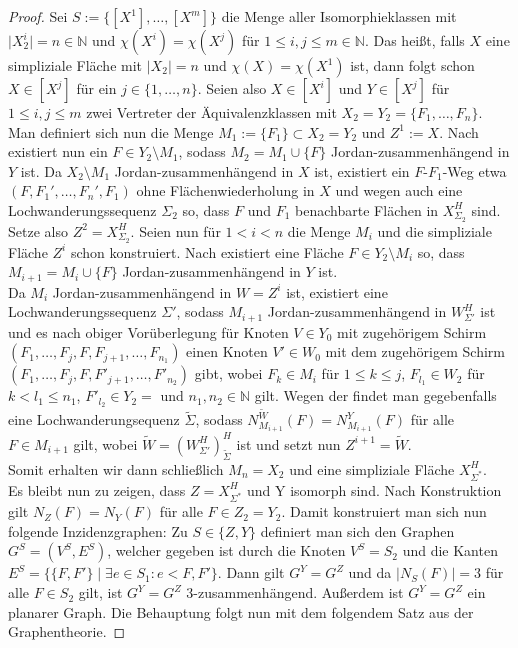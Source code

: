 \documentclass[12pt,titlepage,twoside,cleardoublepage]{article}
\theoremstyle{nummermitklammern}
\numberwithin{equation}{section}
\begin{document}
\begin{proof}
Sei $S:=\{[X^1],\ldots,[X^m]\}$ die Menge aller Isomorphieklassen mit $\vert X^i_2 \vert =n \in \mathbb{N}$ und $\chi(X^i)=\chi(X^j)$ für 
$1 \leq i,j \leq m \in \mathbb{N}$. Das heißt, falls $X$ eine simpliziale Fläche mit $\vert X_2 \vert = n$ und $\chi(X)=\chi(X^1)$ ist, dann folgt schon $X \in [X^j]$ für ein $j \in \{1,\ldots,n\}$. Seien also $X \in [X^i]$ und $Y \in [X^j]$ für $1 \leq i,j \leq m$ zwei Vertreter der Äquivalenzklassen mit $X_2=Y_2=\{F_1,\ldots,F_n\}$.
 Man definiert sich nun die Menge $M_1:=\{F_1\} \subset X_2=Y_2$ und $Z^1:=X$. Nach  existiert nun ein $F \in Y_2\setminus M_1$, sodass $M_2=M_1 \cup \{F\}$ Jordan-zusammenhängend in $Y$ ist. Da $X_2 \setminus M_1$ Jordan-zusammenhängend in $X$ ist, existiert ein $F$-$F_1$-Weg etwa $(F,F_1',\ldots,F_n',F_1)$ ohne Flächenwiederholung in $X$ und wegen  auch eine Lochwanderungssequenz $\Sigma_2$ so, dass $F$ und $F_1$ benachbarte Flächen in $X^H_{\Sigma_2} $ sind. Setze also $Z^2=X^H_{\Sigma_2}$. Seien nun für $1 < i < n$ die Menge $M_i$ und die simpliziale Fläche $Z^i$ schon konstruiert. Nach   existiert eine Fläche $F \in Y_2 \setminus M_i$ so, dass $M_{i+1}=M_i \cup \{F\}$ Jordan-zusammenhängend in $Y$ ist. \\
  Da $M_i$ Jordan-zusammenhängend in $W={Z^i}$ ist, existiert eine Lochwanderungssequenz $\Sigma'$, sodass $M_{i+1}$ Jordan-zusammenhängend in $W^H_{\Sigma'}$ ist und es nach obiger Vorüberlegung für Knoten $V\in Y_0$ mit zugehörigem Schirm \\$(F_1,\ldots,F_j,F,F_{j+1},\ldots,F_{n_1})$ einen Knoten $V'\in W_0$ mit dem zugehörigem Schirm $(F_1,\ldots,F_j,F,F'_{j+1},\ldots,F'_{n_2})$ gibt, wobei $F_k \in M_i$ für $1\leq k\leq j$, $F_{l_1}\in W_2$ für $k< l_1 \leq n_1$, $F'_{l_2}\in Y_2=$ und $n_1,n_2 \in \mathbb{N}$ gilt. Wegen der  findet man gegebenfalls eine Lochwanderungsequenz $\tilde{\Sigma}$, sodass $N_{M_{i+1}}^{\tilde{W}}(F)=N_{M_{i+1}}^Y(F)$ für alle $F \in M_{i+1}$ gilt, wobei $\tilde{W}={(W_{\Sigma'}^H)}^H_{\tilde{\Sigma}}$ ist  und setzt nun $Z^{i+1}=\tilde{W}$.\\
Somit erhalten wir dann schließlich $M_n=X_2$ und eine simpliziale Fläche $X^H_{\Sigma^*}$.\\ Es bleibt nun zu zeigen, dass $Z=X^H_{\Sigma^*}$ und Y isomorph sind. Nach Konstruktion gilt $N_Z(F)=N_Y(F)$ für alle $F\in Z_2=Y_2$. Damit konstruiert man sich nun folgende Inzidenzgraphen: 
Zu $S\in \{Z,Y\}$ definiert man sich den Graphen  $G^S=(V^S,E^S)$, welcher gegeben ist durch die Knoten $V^S=S_2$ und die Kanten $E^S=\{\{F,F'\} \mid \exists e \in S_1 : e<F,F' \}$. 
Dann gilt $G^Y=G^Z$ und da $\vert N_S(F) \vert =3$ für alle $F\in S_2$ gilt,  ist $G^Y=G^Z$ 3-zusammenhängend. Außerdem ist $G^Y=G^Z$ ein planarer Graph. Die Behauptung folgt nun mit dem folgendem Satz aus der Graphentheorie.

\end{proof}
\end{document}
